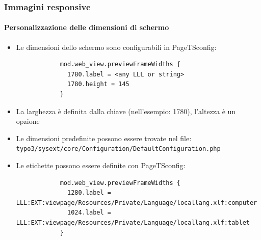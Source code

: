 
\begin{frame}[fragile]
	\frametitle{Immagini responsive}
	\framesubtitle{Personalizzazione delle dimensioni di schermo}

	\begin{itemize}
		\item Le dimensioni dello schermo sono configurabili in PageTSconfig:


		\begin{lstlisting}
			mod.web_view.previewFrameWidths {
			  1780.label = <any LLL or string>
			  1780.height = 145
			}
		\end{lstlisting}

		\item La larghezza è definita dalla chiave (nell'esempio: 1780), l'altezza è un opzione
		\item Le dimensioni predefinite possono essere trovate nel file:\newline
			\small\texttt{typo3/sysext/core/Configuration/DefaultConfiguration.php}\normalsize
		\item Le etichette possono essere definite con PageTSconfig:

		\begin{lstlisting}
			mod.web_view.previewFrameWidths {
			  1280.label = LLL:EXT:viewpage/Resources/Private/Language/locallang.xlf:computer
			  1024.label = LLL:EXT:viewpage/Resources/Private/Language/locallang.xlf:tablet
			}
		\end{lstlisting}

	\end{itemize}

\end{frame}


